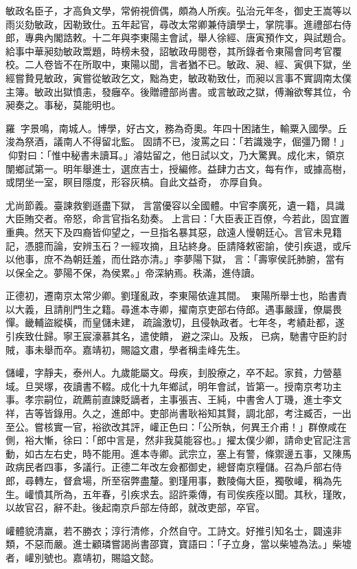 \begin{pinyinscope}
敏政名臣子，才高負文學，常俯視儕偶，頗為人所疾。弘治元年冬，御史王嵩等以雨災劾敏政，因勒致仕。五年起官，尋改太常卿兼侍讀學士，掌院事。進禮部右侍郎，專典內閣誥敕。十二年與李東陽主會試，舉人徐經、唐寅預作文，與試題合。給事中華昶劾敏政鬻題，時榜未發，詔敏政毋閱卷，其所錄者令東陽會同考官覆校。二人卷皆不在所取中，東陽以聞，言者猶不已。敏政、昶、經、寅俱下獄，坐經嘗贄見敏政，寅嘗從敏政乞文，黜為吏，敏政勒致仕，而昶以言事不實調南太僕主簿。敏政出獄憤恚，發癰卒。後贈禮部尚書。或言敏政之獄，傅瀚欲奪其位，令昶奏之。事秘，莫能明也。

羅，字景鳴，南城人。博學，好古文，務為奇奧。年四十困諸生，輸粟入國學。丘浚為祭酒，議南人不得留北監。固請不已，浚罵之曰：「若識幾字，倔彊乃爾！」仰對曰：「惟中秘書未讀耳。」濬姑留之，他日試以文，乃大驚異。成化末，領京闈鄉試第一。明年舉進士，選庶吉士，授編修。益肆力古文，每有作，或據高樹，或閉坐一室，瞑目隱度，形容灰槁。自此文益奇，亦厚自負。

尤尚節義。臺諫救劉遜盡下獄，言當優容以全國體。中官李廣死，遺一籍，具識大臣賄交者。帝怒，命言官指名劾奏。上言曰：「大臣表正百僚，今若此，固宜置重典。然天下及四裔皆仰望之，一旦指名暴其惡，啟遠人慢朝廷心。言官未見籍記，憑臆而論，安辨玉石？一經攻摘，且玷終身。臣請降敕密諭，使引疾退，或斥以他事，庶不為朝廷羞，而仕路亦清。」李夢陽下獄，言：「壽寧侯託肺腑，當有以保全之。夢陽不保，為侯累。」帝深納焉。秩滿，進侍讀。

正德初，遷南京太常少卿。劉瑾亂政，李東陽依違其間。，東陽所舉士也，貽書責以大義，且請削門生之籍。尋進本寺卿，擢南京吏部右侍郎。遇事嚴謹，僚屬畏憚。畿輔盜縱橫，而皇儲未建，疏論激切，且侵執政者。七年冬，考績赴都，遂引疾致仕歸。寧王宸濠慕其名，遣使饋，避之深山。及叛，已病，馳書守臣約討賊，事未舉而卒。嘉靖初，賜謚文肅，學者稱圭峰先生。

儲巏，字靜夫，泰州人。九歲能屬文。母疾，刲股療之，卒不起。家貧，力營墓域。旦哭塚，夜讀書不輟。成化十九年鄉試，明年會試，皆第一。授南京考功主事。孝宗嗣位，疏薦前直諫貶謫者，主事張吉、王純，中書舍人丁璣，進士李文祥，吉等皆錄用。久之，進郎中。吏部尚書耿裕知其賢，調北部，考注臧否，一出至公。嘗核實一官，裕欲改其評，巏正色曰：「公所執，何異王介甫！」群僚咸在側，裕大慚，徐曰：「郎中言是，然非我莫能容也。」擢太僕少卿，請命史官記注言動，如古左右史，時不能用。進本寺卿。武宗立，塞上有警，條禦邊五事，又陳馬政病民者四事，多議行。正德二年改左僉都御史，總督南京糧儲。召為戶部右侍郎，尋轉左，督倉場，所至宿弊盡釐。劉瑾用事，數陵侮大臣，獨敬巏，稱為先生。巏憤其所為，五年春，引疾求去。詔許乘傳，有司俟疾痊以聞。其秋，瑾敗，以故官召，辭不赴。後起南京戶部左侍郎，就改吏部，卒官。

巏體貌清羸，若不勝衣；淳行清修，介然自守。工詩文。好推引知名士，闢遠非類，不惡而嚴。進士顧璘嘗謁尚書邵寶，寶語曰：「子立身，當以柴墟為法。」柴墟者，巏別號也。嘉靖初，賜謚文懿。


\end{pinyinscope}
